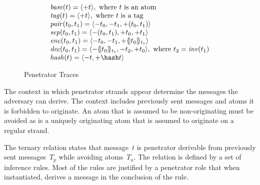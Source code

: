 \documentclass[12pt]{report}
\theoremstyle{definition}
\begin{document}
\begin{figure}
$$\begin{array}{l}
\fn{base}(t)=\seq{\outbnd t},\mbox{ where $t$ is an atom}\\
\fn{tag}(t)=\seq{\outbnd t},\mbox{ where $t$ is a tag}\\
\fn{pair}(t_0,t_1)=\seq{\inbnd t_0,\inbnd t_1, \outbnd(t_0,
  t_1)}\\
\fn{sep}(t_0,t_1)=\seq{\inbnd(t_0, t_1),\outbnd
    t_0,\outbnd t_1}\\
\fn{enc}(t_0,t_1)=\seq{\inbnd t_0,\inbnd t_1,
\outbnd\enc{t_0}{t_1}}\\
\fn{dec}(t_0,t_1)=\seq{\inbnd\enc{t_0}{t_1},
\inbnd t_2,\outbnd t_0},\mbox{ where $t_2=\fn{inv}(t_1)$}\\
\fn{hash}(t)=\seq{\inbnd t,\outbnd\hash t}
\end{array}$$
\caption{Penetrator Traces}\label{fig:pen traces}
\end{figure}

The context in which penetrator strands appear determine the messages
the adversary can derive.  The context includes previously sent
messages and atoms it is forbidden to originate.  An atom that is
assumed to be non-originating must be avoided as is a uniquely
originating atom that is assumed to originate on a regular strand.

The ternary relation  states that message~$t$ is
penetrator derivable from previously sent messages~$T_p$ while
avoiding atoms~$T_a$.  The relation is defined by a set of inference
rules.  Most of the rules are justified by a penetrator role that when
instantiated, derives a message in the conclusion of the rule.
\end{document}
